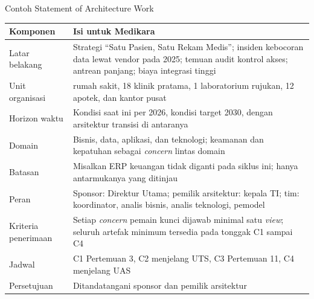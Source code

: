 \documentclass[aspectratio=169, table, 12pt]{beamer}
\begin{document}
\begin{frame}{{\Large Contoh Statement of Architecture Work}}
  \scriptsize
  \begin{tabularx}{\textwidth}{>{\raggedright\arraybackslash}p{2.6cm}
      >{\raggedright\arraybackslash}X}
    \hline
    \textbf{Komponen} & \textbf{Isi untuk Medikara} \\
    \hline
    Latar belakang & Strategi ``Satu Pasien, Satu Rekam Medis''; insiden kebocoran data lewat vendor pada 2025; temuan audit kontrol akses; antrean panjang; biaya integrasi tinggi \\
    \hline
    Unit organisasi & 5 rumah sakit, 18 klinik pratama, 1 laboratorium rujukan, 12 apotek, dan kantor pusat \\
    \hline
    Horizon waktu & Kondisi saat ini per 2026, kondisi target 2030, dengan arsitektur transisi di antaranya \\
    \hline
    Domain & Bisnis, data, aplikasi, dan teknologi; keamanan dan kepatuhan sebagai \textit{concern} lintas domain \\
    \hline
    Batasan & Misalkan ERP keuangan tidak diganti pada siklus ini; hanya antarmukanya yang ditinjau \\
    \hline
    Peran & Sponsor: Direktur Utama; pemilik arsitektur: kepala TI; tim: koordinator, analis bisnis, analis teknologi, pemodel \\
    \hline
    Kriteria penerimaan & Setiap \textit{concern} pemain kunci dijawab minimal satu \textit{view}; seluruh artefak minimum tersedia pada tonggak C1 sampai C4 \\
    \hline
    Jadwal & C1 Pertemuan 3, C2 menjelang UTS, C3 Pertemuan 11, C4 menjelang UAS \\
    \hline
    Persetujuan & Ditandatangani sponsor dan pemilik arsitektur \\
    \hline
  \end{tabularx}
\end{frame}
\end{document}
